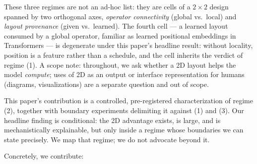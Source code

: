 \documentclass[11pt]{article}
\begin{document}
These three regimes are not an ad-hoc list: they are cells of a $2 \times 2$
design spanned by two orthogonal axes, \emph{operator connectivity}
(global vs.\ local) and \emph{layout provenance} (given vs.\ learned). The
fourth cell --- a learned layout consumed by a global operator, familiar as
learned positional embeddings in Transformers --- is degenerate under this
paper's headline result: without locality, position is a feature rather than
a schedule, and the cell inherits the verdict of regime (1). A scope note:
throughout, we ask whether a 2D layout helps the model \emph{compute}; uses
of 2D as an output or interface representation for humans (diagrams,
visualizations) are a separate question and out of scope.

This paper's contribution is a controlled, pre-registered characterization of
regime (2), together with boundary experiments delimiting it against (1) and
(3). Our headline finding is conditional: the 2D advantage exists, is large,
and is mechanistically explainable, but only inside a regime whose boundaries
we can state precisely. We map that regime; we do not advocate beyond it.

Concretely, we contribute:
\end{document}
